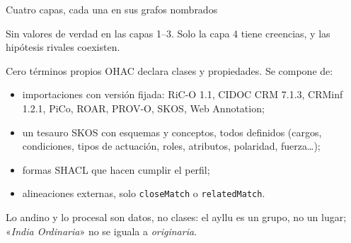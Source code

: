 \documentclass[aspectratio=169,11pt]{beamer}
\newcommand{\cita}[1]{«\textit{#1}»}
\newcommand{\ttt}[1]{\texttt{\small #1}}
\newcommand{\cifra}[1]{\textbf{\alert{#1}}}
\begin{document}
\begin{frame}{Cuatro capas, cada una en sus grafos nombrados}
\centering
{}

\smallskip
\footnotesize Sin valores de verdad en las capas 1--3. Solo la capa 4 tiene creencias, y las hipótesis rivales coexisten.
\end{frame}

\begin{frame}{Cero términos propios}
OHAC declara \cifra{\cifraTerminosPropios} clases y propiedades. Se compone de:
\begin{itemize}
\item importaciones con versión fijada: RiC-O 1.1, CIDOC CRM 7.1.3, CRMinf 1.2.1, PiCo, ROAR, PROV-O, SKOS, Web Annotation;
\item un \alert{tesauro SKOS} con \cifra{\cifraEsquemas} esquemas y \cifra{\cifraConceptos} conceptos, todos definidos
      (cargos, condiciones, tipos de actuación, roles, atributos, polaridad, fuerza…);
\item \cifra{\cifraFormas} \alert{formas SHACL} que hacen cumplir el perfil;
\item \cifra{\cifraAlineaciones} alineaciones externas, solo \ttt{closeMatch} o \ttt{relatedMatch}.
\end{itemize}
\medskip
Lo andino y lo procesal son \alert{datos}, no clases: el ayllu es un grupo, no un lugar; \cita{India Ordinaria} no se
iguala a \emph{originaria}.
\end{frame}
\end{document}
